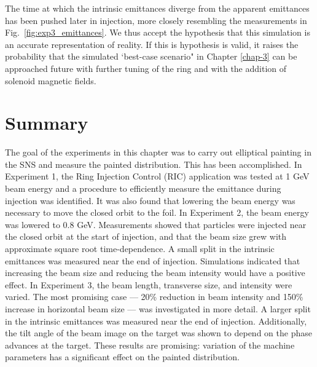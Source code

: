 %
The time at which the intrinsic emittances diverge from the apparent emittances has been pushed later in injection, more closely resembling the measurements in Fig.~\ref{fig:exp3_emittances}. We thus accept the hypothesis that this simulation is an accurate representation of reality. If this is hypothesis is valid, it raises the probability that the simulated `best-case scenario" in Chapter \ref{chap-3} can be approached future with further tuning of the ring and with the addition of solenoid magnetic fields.



\section{Summary}

The goal of the experiments in this chapter was to carry out elliptical painting in the SNS and measure the painted distribution. This has been accomplished. In Experiment 1, the Ring Injection Control (RIC) application was tested at 1 GeV beam energy and a procedure to efficiently measure the emittance during injection was identified. It was also found that lowering the beam energy was necessary to move the closed orbit to the foil. In Experiment 2, the beam energy was lowered to 0.8 GeV. Measurements showed that particles were injected near the closed orbit at the start of injection, and that the beam size grew with approximate square root time-dependence. A small split in the intrinsic emittances was measured near the end of injection. Simulations indicated that increasing the beam size and reducing the beam intensity would have a positive effect. In Experiment 3, the beam length, transverse size, and intensity were varied. The most promising case — 20\% reduction in beam intensity and 150\% increase in horizontal beam size — was investigated in more detail. A larger split in the intrinsic emittances was measured near the end of injection. Additionally, the tilt angle of the beam image on the target was shown to depend on the phase advances at the target. These results are promising: variation of the machine parameters has a significant effect on the painted distribution.